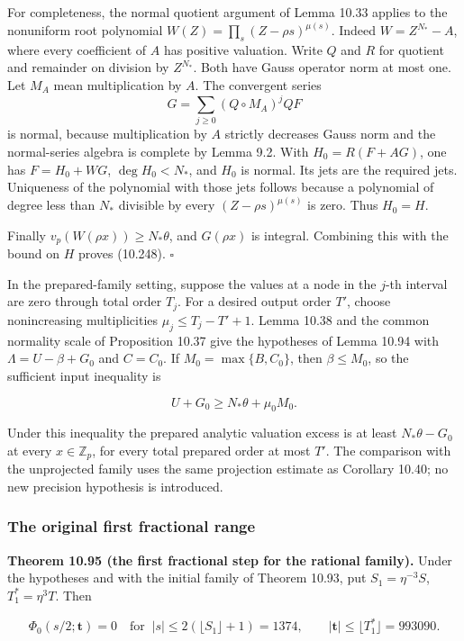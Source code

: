 \documentclass[
  11pt,
  a4paper,
]{article}
\begin{document}
For completeness, the normal quotient argument of Lemma 10.33 applies to
the nonuniform root polynomial \(W(Z)=\prod_s(Z-\rho s)^{\mu(s)}\).
Indeed \(W=Z^{N_*}-A\), where every coefficient of \(A\) has positive
valuation. Write \(Q\) and \(R\) for quotient and remainder on division
by \(Z^{N_*}\). Both have Gauss operator norm at most one. Let \(M_A\)
mean multiplication by \(A\). The convergent series \[
G=\sum_{j\ge0}(Q\circ M_A)^jQF
\] is normal, because multiplication by \(A\) strictly decreases Gauss
norm and the normal-series algebra is complete by Lemma 9.2. With
\(H_0=R(F+AG)\), one has \(F=H_0+WG\), \(\deg H_0<N_*\), and \(H_0\) is
normal. Its jets are the required jets. Uniqueness of the polynomial
with those jets follows because a polynomial of degree less than \(N_*\)
divisible by every \((Z-\rho s)^{\mu(s)}\) is zero. Thus \(H_0=H\).

Finally \(v_p(W(\rho x))\ge N_*\theta\), and \(G(\rho x)\) is integral.
Combining this with the bound on \(H\) proves (10.248). \(\square\)

In the prepared-family setting, suppose the values at a node in the
\(j\)-th interval are zero through total order \(T_j\). For a desired
output order \(T'\), choose nonincreasing multiplicities
\(\mu_j\le T_j-T'+1\). Lemma 10.38 and the common normality scale of
Proposition 10.37 give the hypotheses of Lemma 10.94 with
\(\Lambda=U-\beta+G_0\) and \(C=C_0\). If \(M_0=\max\{B,C_0\}\), then
\(\beta\le M_0\), so the sufficient input inequality is

\[
U+G_0\ge N_*\theta+\mu_0M_0.
\tag{10.249}
\]

Under this inequality the prepared analytic valuation excess is at least
\(N_*\theta-G_0\) at every \(x\in\mathbb Z_p\), for every total prepared
order at most \(T'\). The comparison with the unprojected family uses
the same projection estimate as Corollary 10.40; no new precision
hypothesis is introduced.

\subsubsection{The original first fractional
range}\label{the-original-first-fractional-range}

\textbf{Theorem 10.95 (the first fractional step for the rational
family).} Under the hypotheses and with the initial family of Theorem
10.93, put \(S_1=\eta^{-3}S\), \(T_1^*=\eta^3T\). Then

\[
\Phi_0(s/2;\boldsymbol t)=0
\quad\text{for }\ |s|\le2(\lfloor S_1\rfloor+1)=1374,\qquad
|\boldsymbol t|\le\lfloor T_1^*\rfloor=993090.
\tag{10.250}
\]
\end{document}
